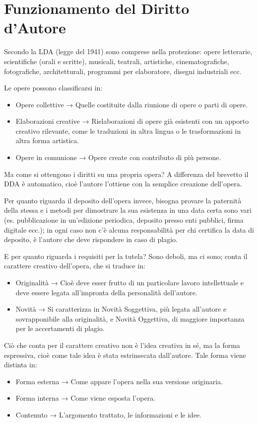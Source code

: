 \section{Funzionamento del Diritto d’Autore}

Secondo la LDA (legge del 1941) sono comprese nella protezione: opere letterarie, scientifiche (orali e scritte), musicali, teatrali, artistiche, cinematografiche, fotografiche, architetturali, programmi per elaboratore, disegni
industriali ecc. 

Le opere possono classificarsi in:
\begin{itemize}
    \item Opere collettive → Quelle costituite dalla riunione di opere o parti di opere.
    \item Elaborazioni creative → Rielaborazioni di opere già esistenti con un apporto creativo rilevante, come le traduzioni in altra lingua o le trasformazioni in altra forma artistica.
    \item Opere in comunione → Opere create con contributo di più persone.
\end{itemize}

Ma come si ottengono i diritti su una propria opera? A differenza del brevetto il DDA è automatico, cioè l’autore l’ottiene con la semplice creazione dell’opera.


Per quanto riguarda il deposito dell’opera invece, bisogna provare la paternità della stessa e i metodi per dimostrare la sua esistenza in una data certa sono vari (es. pubblicazione in un’edizione periodica, deposito presso enti pubblici, firma digitale ecc.); in ogni caso non c’è alcuna responsabilità per chi certifica la data di deposito, è l’autore che deve rispondere in caso di plagio.

E per quanto riguarda i requisiti per la tutela? Sono deboli, ma ci sono; conta il carattere creativo dell’opera, che si traduce in:
\begin{itemize}
    \item Originalità → Cioè deve esser frutto di un particolare lavoro intellettuale e deve essere legata all’impronta della personalità dell’autore.
    \item Novità → Si caratterizza in Novità Soggettiva, più legata all’autore e sovrapponibile alla originalità, e Novità Oggettiva, di maggiore importanza per le accertamenti di plagio.
\end{itemize}

Ciò che conta per il carattere creativo non è l’idea creativa in sé, ma la forma espressiva, cioè come tale idea è
stata estrinsecata dall’autore. Tale forma viene distinta in:
\begin{itemize}
    \item Forma esterna → Come appare l’opera nella sua versione originaria.
    \item Forma interna → Come viene esposta l’opera.
    \item Contenuto → L’argomento trattato, le informazioni e le idee.
\end{itemize}

